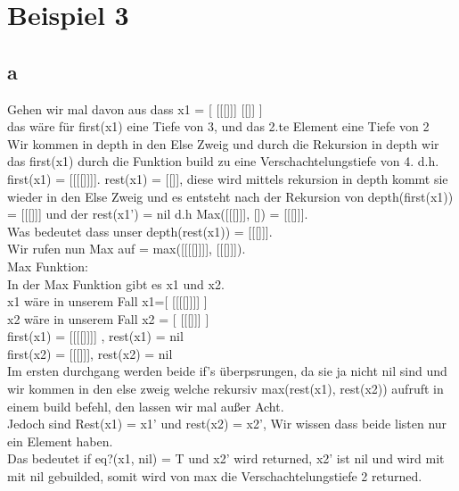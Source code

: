 \documentclass[12pt,runningheads,a4paper]{llncs}
\begin{document}
\section*{Beispiel 3}
\subsection*{a}
Gehen wir mal davon aus dass \textsf{x1 = [ [[[]]]  [[]] ]}  \\
das wäre für first(x1) eine Tiefe von 3, und das 2.te Element eine Tiefe von 2\\
Wir kommen in depth in den Else Zweig und durch die Rekursion in depth wir das first(x1) durch die Funktion build zu eine Verschachtelungstiefe von 4. d.h. first(x1) = [[[[]]]].
rest(x1) = [[]], diese wird mittels rekursion in depth kommt sie wieder in den Else Zweig und es entsteht nach der Rekursion von depth(first(x1)) = [[[]]] und der rest(x1') = nil d.h Max([[[]]], []) = [[[]]].\\
Was bedeutet dass unser depth(rest(x1)) = [[[]]].\\
Wir rufen nun Max auf = max([[[[]]]], [[[]]]).\\
Max Funktion:\\
In der Max Funktion gibt es x1 und x2.\\
x1 wäre in unserem Fall x1=[ [[[[]]]] ]\\
x2 wäre in unserem Fall x2 = [ [[[]]] ]\\
first(x1) = [[[[]]]] , rest(x1) = nil\\
first(x2) = [[[]]], rest(x2) = nil\\
Im ersten durchgang werden beide if's überpsrungen, da sie ja nicht nil sind und wir kommen in den else zweig welche rekursiv max(rest(x1), rest(x2)) aufruft in einem build befehl, den lassen wir mal außer Acht.\\
Jedoch sind Rest(x1) = x1' und rest(x2) = x2',
Wir wissen dass beide listen nur ein Element haben.\\
Das bedeutet if eq?(x1, nil) = T und x2' wird returned, x2' ist nil und wird mit mit nil gebuilded, somit wird von max die Verschachtelungstiefe 2 returned.
\newpage
\end{document}
